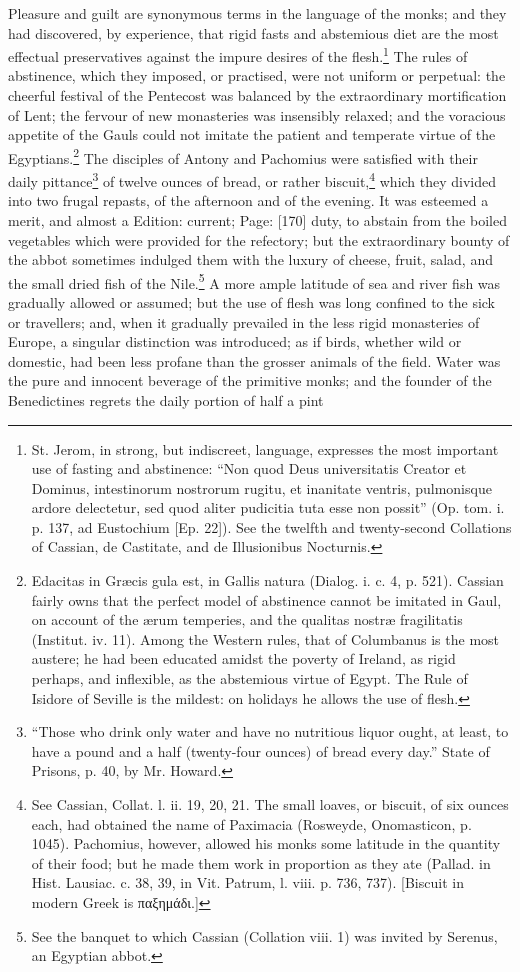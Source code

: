 Pleasure and guilt are synonymous terms in the language of the monks; and they had discovered, by experience, that rigid fasts and abstemious diet are the most effectual preservatives against the impure desires of the flesh.\footnote{St. Jerom, in strong, but indiscreet, language, expresses the most important use of fasting and abstinence: \texthebrew{“}Non quod Deus universitatis Creator et Dominus, intestinorum nostrorum rugitu, et inanitate ventris, pulmonisque ardore delectetur, sed quod aliter pudicitia tuta esse non possit\texthebrew{}” (Op. tom. i. p. 137, ad Eustochium [Ep. 22]). See the twelfth and twenty-second Collations of Cassian, de Castitate, and de Illusionibus Nocturnis.} The rules of abstinence, which they imposed, or practised, were not uniform or perpetual: the cheerful festival of the Pentecost was balanced by the extraordinary mortification of Lent; the fervour of new monasteries was insensibly relaxed; and the voracious appetite of the Gauls could not imitate the patient and temperate virtue of the Egyptians.\footnote{Edacitas in Græcis gula est, in Gallis natura (Dialog. i. c. 4, p. 521). Cassian fairly owns that the perfect model of abstinence cannot be imitated in Gaul, on account of the ærum temperies, and the qualitas nostræ fragilitatis (Institut. iv. 11). Among the Western rules, that of Columbanus is the most austere; he had been educated amidst the poverty of Ireland, as rigid perhaps, and inflexible, as the abstemious virtue of Egypt. The Rule of Isidore of Seville is the mildest: on holidays he allows the use of flesh.} The disciples of Antony and Pachomius were satisfied with their daily pittance\footnote{\texthebrew{“}Those who drink only water and have no nutritious liquor ought, at least, to have a pound and a half (twenty-four ounces) of bread every day.\texthebrew{}” State of Prisons, p. 40, by Mr. Howard.} of twelve ounces of bread, or rather biscuit,\footnote{See Cassian, Collat. l. ii. 19, 20, 21. The small loaves, or biscuit, of six ounces each, had obtained the name of Paximacia (Rosweyde, Onomasticon, p. 1045). Pachomius, however, allowed his monks some latitude in the quantity of their food; but he made them work in proportion as they ate (Pallad. in Hist. Lausiac. c. 38, 39, in Vit. Patrum, l. viii. p. 736, 737). [Biscuit in modern Greek is \textgreek{παξημάδι}.]} which they divided into two frugal repasts, of the afternoon and of the evening. It was esteemed a merit, and almost a Edition: current; Page: [170] duty, to abstain from the boiled vegetables which were provided for the refectory; but the extraordinary bounty of the abbot sometimes indulged them with the luxury of cheese, fruit, salad, and the small dried fish of the Nile.\footnote{See the banquet to which Cassian (Collation viii. 1) was invited by Serenus, an Egyptian abbot.} A more ample latitude of sea and river fish was gradually allowed or assumed; but the use of flesh was long confined to the sick or travellers; and, when it gradually prevailed in the less rigid monasteries of Europe, a singular distinction was introduced; as if birds, whether wild or domestic, had been less profane than the grosser animals of the field. Water was the pure and innocent beverage of the primitive monks; and the founder of the Benedictines regrets the daily portion of half a pint 